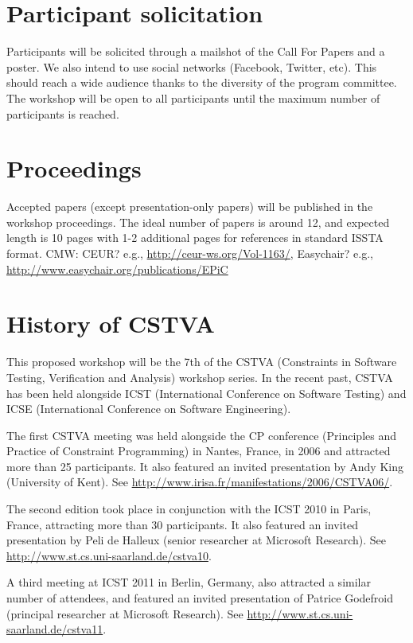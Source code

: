\documentclass{sig-alternate}
\newcommand{\cmw}[1]{{\color{red} CMW: #1}}
\begin{document}
\section{Participant solicitation}

Participants will be solicited through a mailshot of the Call For Papers and a
poster. We also intend to use social networks (Facebook, Twitter, etc). This
should reach a wide audience thanks to the diversity of the program committee.
The workshop will be open to all participants until the maximum number of
participants is reached. 

\section{Proceedings}

Accepted papers (except presentation-only papers) will be published in the
workshop proceedings.  The ideal number of papers is around 12, and expected
length is 10 pages with 1-2 additional pages for references in standard ISSTA
format.
\cmw{CEUR? e.g., \url{http://ceur-ws.org/Vol-1163/}, 
Easychair? e.g., \url{http://www.easychair.org/publications/EPiC}}


\section{History of CSTVA}

This proposed workshop will be the 7th of the CSTVA (Constraints in Software
Testing, Verification and Analysis) workshop series. In the recent past, CSTVA
has been held alongside ICST (International Conference on Software Testing) and
ICSE (International Conference on Software Engineering).  

The first CSTVA meeting was held alongside the CP conference (Principles and
Practice of Constraint Programming) in Nantes, France, in 2006 and attracted
more than 25 participants. It also featured an invited presentation by Andy
King (University of Kent).
See \url{http://www.irisa.fr/manifestations/2006/CSTVA06/}.

The second edition took place in conjunction with the ICST 2010 in Paris,
France, attracting more than 30 participants. It also featured an invited
presentation by Peli de Halleux (senior researcher at Microsoft Research).  
See \url{http://www.st.cs.uni-saarland.de/cstva10}. 

A third meeting at ICST 2011 in Berlin, Germany, also attracted a similar
number of attendees, and featured an invited presentation of Patrice Godefroid
(principal researcher at Microsoft Research).  
See \url{http://www.st.cs.uni-saarland.de/cstva11}.
\end{document}
